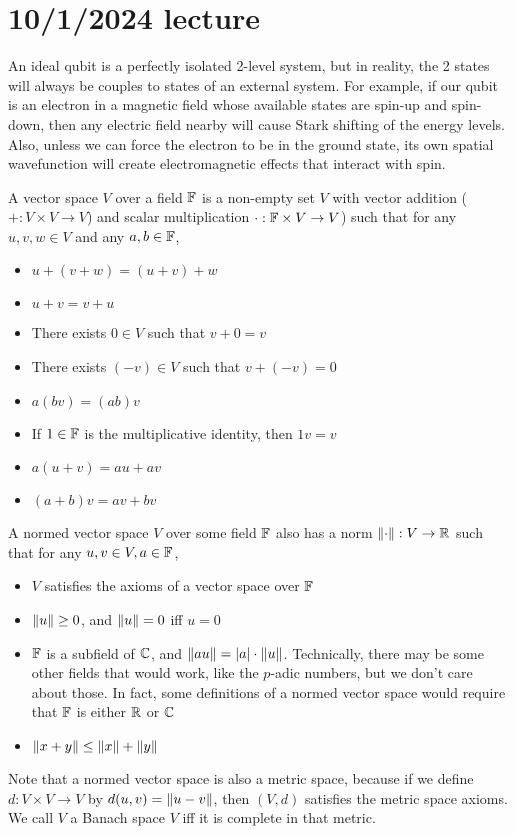 \documentclass{article}
\begin{document}
\section{10/1/2024 lecture}
An ideal qubit is a perfectly isolated 2-level system, but in reality, the 2 states will always be couples to states of an external system. For example, if our qubit is an electron in a magnetic field whose available states are spin-up and spin-down, then any electric field nearby will cause Stark shifting of the energy levels. Also, unless we can force the electron to be in the ground state, its own spatial wavefunction will create electromagnetic effects that interact with spin.
\bigskip
\par
A vector space $V$ over a field $\mathbb{F}$ is a non-empty set $V$ with vector addition ($+ : V \times V \rightarrow V$) and scalar multiplication $\cdot : \mathbb{F} \times V \rightarrow V$) such that for any $u,v,w \in V$ and any $a,b \in \mathbb{F}$,
\begin{itemize}
    \item $u+(v+w)=(u+v)+w$
    \item $u+v=v+u$
    \item There exists $0 \in V$ such that $v+0=v$
    \item There exists $(-v) \in V$ such that $v+(-v)=0$
    \item $a(bv)=(ab)v$
    \item If $1 \in \mathbb{F}$ is the multiplicative identity, then $1v=v$
    \item $a(u+v)=au+av$
    \item $(a+b)v=av+bv$
\end{itemize}
A  normed vector space $V$ over some field $\mathbb{F}$ also has a norm $\left\lVert \cdot\right\rVert : V \rightarrow \mathbb{R}$ such that for any $u,v \in V, a \in \mathbb{F}$,
\begin{itemize}
    \item $V$ satisfies the axioms of a vector space over $\mathbb{F}$
    \item $\left\lVert u\right\rVert \geq 0$, and $\left\lVert u\right\rVert=0$ iff $u=0$
    \item $\mathbb{F}$ is a subfield of $\mathbb{C}$, and $\left\lVert au\right\rVert=\left\lvert a \right\rvert \cdot \left\lVert u\right\rVert$. Technically, there may be some other fields that would work, like the $p$-adic numbers, but we don't care about those. In fact, some definitions of a normed vector space would require that $\mathbb{F}$ is either $\mathbb{R}$ or $\mathbb{C}$
    \item $\left\lVert x+y\right\rVert\leq \left\lVert x\right\rVert+\left\lVert y\right\rVert$
\end{itemize}
Note that a normed vector space is also a metric space, because if we define $d: V \times V \rightarrow V$ by $d(u,v)=\left\lVert u-v\right\rVert$, then $(V, d)$ satisfies the metric space axioms. We call $V$ a Banach space $V$ iff it is complete in that metric.
\end{document}
